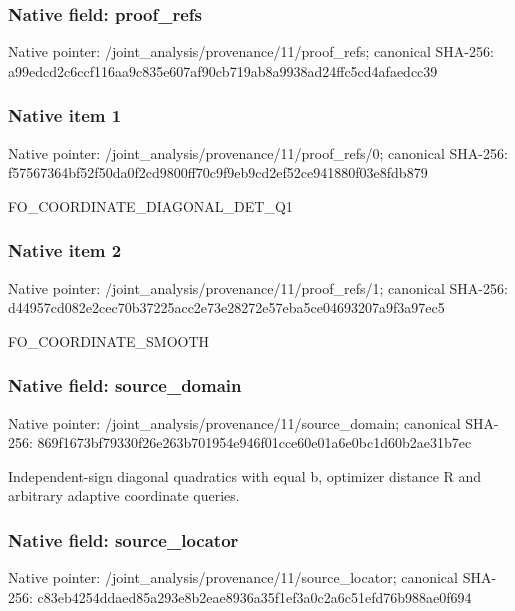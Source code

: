 \documentclass[10pt,a4paper]{article}
\begin{document}
\subsubsection{Native field: proof\_\allowbreak{}refs}
Native pointer: /joint\_\allowbreak{}analysis/provenance/11/proof\_\allowbreak{}refs; canonical SHA-256: a99edcd2c6ccf116aa9c835e607af90cb719ab8a9938ad24ffc5cd4afaedcc39

\subsubsection{Native item 1}
Native pointer: /joint\_\allowbreak{}analysis/provenance/11/proof\_\allowbreak{}refs/0; canonical SHA-256: f57567364bf52f50da0f2cd9800ff70c9f9eb9cd2ef52ce941880f03e8fdb879

\begingroup\raggedright\sloppy FO\_\allowbreak{}COORDINATE\_\allowbreak{}DIAGONAL\_\allowbreak{}DET\_\allowbreak{}Q1\par\endgroup

\subsubsection{Native item 2}
Native pointer: /joint\_\allowbreak{}analysis/provenance/11/proof\_\allowbreak{}refs/1; canonical SHA-256: d44957cd082e2cec70b37225acc2e73e28272e57eba5ce04693207a9f3a97ec5

\begingroup\raggedright\sloppy FO\_\allowbreak{}COORDINATE\_\allowbreak{}SMOOTH\par\endgroup

\subsubsection{Native field: source\_\allowbreak{}domain}
Native pointer: /joint\_\allowbreak{}analysis/provenance/11/source\_\allowbreak{}domain; canonical SHA-256: 869f1673bf79330f26e263b701954e946f01cce60e01a6e0bc1d60b2ae31b7ec

\begingroup\raggedright\sloppy Independent-sign diagonal quadratics with equal b,\allowbreak{} optimizer distance R and arbitrary adaptive coordinate queries.\par\endgroup

\subsubsection{Native field: source\_\allowbreak{}locator}
Native pointer: /joint\_\allowbreak{}analysis/provenance/11/source\_\allowbreak{}locator; canonical SHA-256: c83eb4254ddaed85a293e8b2eae8936a35f1ef3a0c2a6c51efd76b988ae0f694
\end{document}
